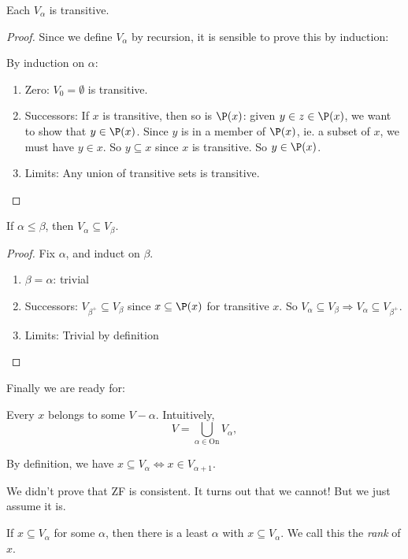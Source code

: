 \documentclass[a4paper]{article}
\begin{document}
\begin{lemma}
  Each $V_\alpha$ is transitive.
\end{lemma}

\begin{proof}
  Since we define $V_\alpha$ by recursion, it is sensible to prove this by induction:

  By induction on $\alpha$:
  \begin{enumerate}
    \item Zero: $V_0 = \emptyset$ is transitive.
    \item Successors: If $x$ is transitive, then so is $\P(x)$: given $y\in z\in \P(x)$, we want to show that $y\in \P(x)$. Since $y$ is in a member of $\P(x)$, ie. a subset of $x$, we must have $y\in x$. So $y\subseteq x$ since $x$ is transitive. So $y\in \P(x)$.
    \item Limits: Any union of transitive sets is transitive.
  \end{enumerate}
\end{proof}

\begin{lemma}
  If $\alpha \leq \beta$, then $V_\alpha \subseteq V_\beta$.
\end{lemma}

\begin{proof}
  Fix $\alpha$, and induct on $\beta$.
  \begin{enumerate}
    \item $\beta = \alpha$: trivial
    \item Successors: $V_{\beta^+}\subseteq V_\beta$ since $x\subseteq \P(x)$ for transitive $x$. So $V_\alpha \subseteq V_\beta \Rightarrow  V_\alpha \subseteq V_{\beta^+}$.
    \item Limits: Trivial by definition
  \end{enumerate}
\end{proof}

Finally we are ready for:
\begin{thm}
  Every $x$ belongs to some $V-\alpha$. Intuitively,
  \[
    V = \bigcup_{\alpha \in \mathrm{On}} V_\alpha,
  \]
\end{thm}
\note By definition, we have $x\subseteq V_\alpha \Leftrightarrow x\in V_{\alpha + 1}$.

\note We didn't prove that ZF is consistent. It turns out that we cannot! But we just assume it is.

\note If $x\subseteq V_\alpha$ for some $\alpha$, then there is a least $\alpha$ with $x\subseteq V_\alpha$. We call this the \emph{rank} of $x$.
\end{document}
